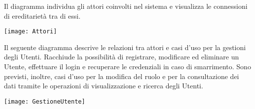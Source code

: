 \documentclass[a4paper]{report}
\begin{document}
\clearpage
{}

Il diagramma individua gli attori coinvolti nel sistema e visualizza le connessioni di ereditarietà tra di essi.

\begin{figure*}[ht]
    \centering
    \texttt{[image: Attori]}
\end{figure*}

\clearpage
{}

Il seguente diagramma descrive le relazioni tra attori e casi d'uso per la gestioni degli Utenti. 
Racchiude la possibilità di registrare, modificare ed eliminare un Utente, effettuare il login e recuperare le credenziali in caso di smarrimento.
Sono previsti, inoltre, casi d'uso per la modifica del ruolo e per la consultazione dei dati tramite le operazioni di visualizzazione e ricerca degli Utenti.

\begin{figure*}[ht]
    \centering
    \texttt{[image: GestioneUtente]}
\end{figure*}
\end{document}
